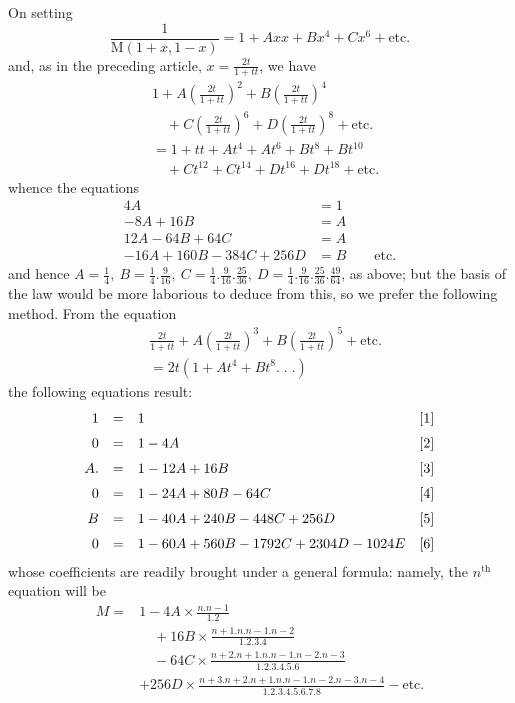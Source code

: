 \begingroup
\renewcommand{\arraystretch}{1.45}

On setting
\[
\frac1{\mathrm{M}(1+x,1-x)}=1+Axx+Bx^4+Cx^6+\text{etc.}
\]
and, as in the preceding article, \(x=\frac{2t}{1+tt}\), we have
\[
\begin{aligned}
&1+A(\frac{2t}{1+tt})^2+B(\frac{2t}{1+tt})^4\\&\quad+C(\frac{2t}{1+tt})^6+D(\frac{2t}{1+tt})^8+\text{etc.}\\[6pt]
&=1+tt+At^4+At^6+Bt^8+Bt^{10}\\&\quad+Ct^{12}+Ct^{14}+Dt^{16}+Dt^{18}+\text{etc.}
\end{aligned}
\]
whence the equations
\[
\begin{aligned}
4A&=1\\[6pt]
-8A+16B&=A\\[6pt]
12A-64B+64C&=A\\[6pt]
-16A+160B-384C+256D&=B\qquad\text{etc.}
\end{aligned}
\]
and hence \(A=\frac14,\allowbreak \ B=\frac14.\frac9{16},\allowbreak \ C=\frac14.\frac9{16}.\frac{25}{36},\allowbreak \ D=\frac14.\frac9{16}.\frac{25}{36}.\frac{49}{64}\), as above;
but the basis of the law would be more laborious to deduce from this, so we prefer the following method. From the equation
\[
\begin{aligned}&\frac{2t}{1+tt}+A(\frac{2t}{1+tt})^3+B(\frac{2t}{1+tt})^5+\text{etc.}\\&=2t(1+At^4+Bt^8.\;.\;.)\end{aligned}
\]
the following equations result:
\[
\begin{array}{@{}rcl@{\quad}r@{}}
1&=&1&[1]\\[6pt]
0&=&1-4A&[2]\\[6pt]
A.&=&1-12A+16B&[3]\\[6pt]
0&=&1-24A+80B-64C&[4]\\[6pt]
B&=&1-40A+240B-448C+256D&[5]\\[6pt]
0&=&1-60A+560B-1792C+2304D-1024E&[6]
\end{array}
\]
whose coefficients are readily brought under a general formula: namely, the \(n^{\mathrm{th}}\) equation will be
\[
\begin{aligned}
M={}&1-4A\times\frac{n.n-1}{1.2}\\&\quad+16B\times\frac{n+1.n.n-1.n-2}{1.2.3.4}\\&\quad-64C\times\frac{n+2.n+1.n.n-1.n-2.n-3}{1.2.3.4.5.6}\\[6pt]
&+256D\times\frac{n+3.n+2.n+1.n.n-1.n-2.n-3.n-4}{1.2.3.4.5.6.7.8}-\text{etc.}
\end{aligned}
\]
